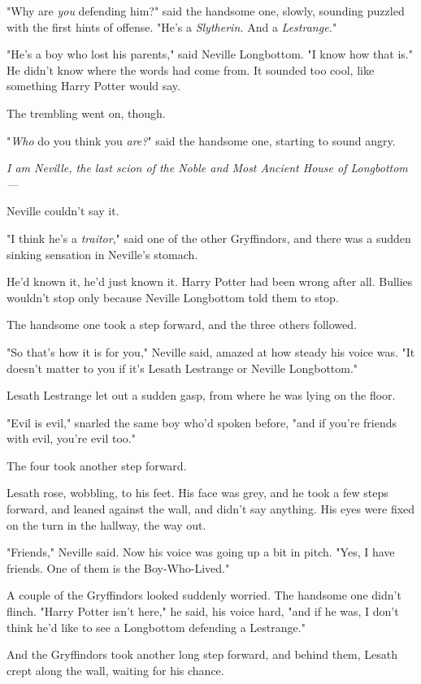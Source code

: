 "Why are \emph{you} defending him?" said the handsome one, slowly, sounding
puzzled with the first hints of offense. "He's a \emph{Slytherin.} And a
\emph{Lestrange.}"

"He's a boy who lost his parents," said Neville Longbottom. "I know how that
is." He didn't know where the words had come from. It sounded too cool, like
something Harry Potter would say.

The trembling went on, though.

"\emph{Who} do you think you \emph{are?}" said the handsome one, starting to
sound angry.

\emph{I am Neville, the last scion of the Noble and Most Ancient House of
Longbottom---}

Neville couldn't say it.

"I think he's a \emph{traitor}," said one of the other Gryffindors, and there
was a sudden sinking sensation in Neville's stomach.

He'd known it, he'd just known it. Harry Potter had been wrong after all.
Bullies wouldn't stop only because Neville Longbottom told them to stop.

The handsome one took a step forward, and the three others followed.

"So that's how it is for you," Neville said, amazed at how steady his voice
was. "It doesn't matter to you if it's Lesath Lestrange or Neville Longbottom."

Lesath Lestrange let out a sudden gasp, from where he was lying on the floor.

"Evil is evil," snarled the same boy who'd spoken before, "and if you're
friends with evil, you're evil too."

The four took another step forward.

Lesath rose, wobbling, to his feet. His face was grey, and he took a few steps
forward, and leaned against the wall, and didn't say anything. His eyes were
fixed on the turn in the hallway, the way out.

"Friends," Neville said. Now his voice was going up a bit in pitch. "Yes, I
have friends. One of them is the Boy-Who-Lived."

A couple of the Gryffindors looked suddenly worried. The handsome one didn't
flinch. "Harry Potter isn't here," he said, his voice hard, "and if he was, I
don't think he'd like to see a Longbottom defending a Lestrange."

And the Gryffindors took another long step forward, and behind them, Lesath
crept along the wall, waiting for his chance.

